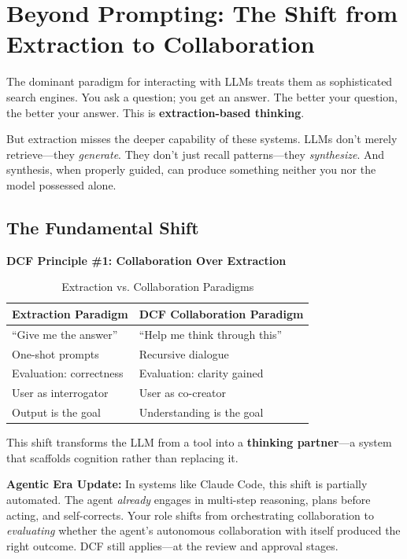 \chapter{Beyond Prompting: The Shift from Extraction to Collaboration}

The dominant paradigm for interacting with LLMs treats them as sophisticated search engines. You ask a question; you get an answer. The better your question, the better your answer. This is \textbf{extraction-based thinking}.

But extraction misses the deeper capability of these systems. LLMs don't merely retrieve---they \emph{generate}. They don't just recall patterns---they \emph{synthesize}. And synthesis, when properly guided, can produce something neither you nor the model possessed alone.

\section{The Fundamental Shift}

\textbf{DCF Principle \#1: Collaboration Over Extraction}

\begin{table}[H]
\centering
\begin{tabular}{ll}
\toprule
\textbf{Extraction Paradigm} & \textbf{DCF Collaboration Paradigm} \\
\midrule
``Give me the answer'' & ``Help me think through this'' \\
One-shot prompts & Recursive dialogue \\
Evaluation: correctness & Evaluation: clarity gained \\
User as interrogator & User as co-creator \\
Output is the goal & Understanding is the goal \\
\bottomrule
\end{tabular}
\caption{Extraction vs. Collaboration Paradigms}
\end{table}

This shift transforms the LLM from a tool into a \textbf{thinking partner}---a system that scaffolds cognition rather than replacing it.

\begin{quotebox}
\textbf{Agentic Era Update:} In systems like Claude Code, this shift is partially automated. The agent \emph{already} engages in multi-step reasoning, plans before acting, and self-corrects. Your role shifts from orchestrating collaboration to \emph{evaluating} whether the agent's autonomous collaboration with itself produced the right outcome. DCF still applies---at the review and approval stages.
\end{quotebox}
